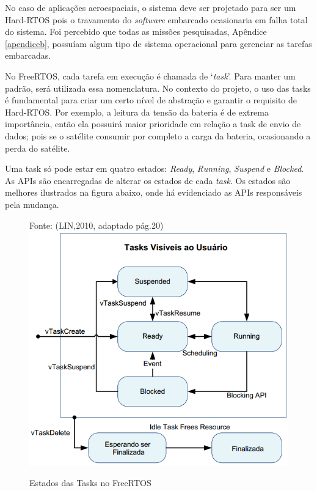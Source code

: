 No caso de aplicações aeroespaciais, o sistema deve ser projetado para ser um Hard-RTOS pois o travamento do \textit{software} embarcado ocasionaria em falha total do sistema. Foi percebido que todas as missões pesquisadas, Apêndice \ref{apendiceb}, possuíam algum tipo de sistema operacional para gerenciar as tarefas embarcadas.

No FreeRTOS, cada tarefa em execução é chamada de ‘\textit{task}’. Para manter um padrão, será utilizada essa nomenclatura. No contexto do projeto, o uso das tasks é fundamental para criar um certo nível de abstração e garantir o requisito de Hard-RTOS. Por exemplo, a leitura da tensão da bateria é de extrema importância, então ela possuirá maior prioridade em relação a task de envio de dados; pois se o satélite consumir por completo a carga da bateria, ocasionando a perda do satélite.

Uma task só pode estar em quatro estados: \textit{Ready}, \textit{Running}, \textit{Suspend} e \textit{Blocked}. As APIs são encarregadas de alterar os estados de cada \textit{task}. Os estados são melhores ilustrados na figura abaixo, onde há evidenciado as APIs responsáveis pela mudança.

\begin{figure}[h]
	\centering
	
	Fonte: (LIN,2010, adaptado pág.20)
	\includegraphics[keepaspectratio=true,scale=0.8]{figuras/freertosTasks.PNG}
	\caption{Estados das Tasks no FreeRTOS}

	\label{fig23}
\end{figure}
\FloatBarrier
